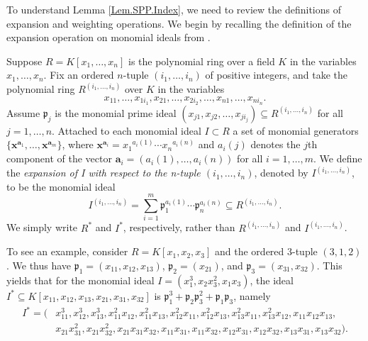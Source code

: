 \documentclass[11pt]{amsart}
\begin{document}
 To understand  Lemma \ref{Lem.SPP.Index}, we need to review the definitions of expansion and weighting operations. 
 We begin by recalling   the definition of the expansion operation  on monomial ideals from  \cite{BH}. \par 
Suppose  $R = K[x_1, \ldots , x_n]$ is  the polynomial ring over a field $K$ in the variables $x_1, \ldots , x_n$. Fix an ordered $n$-tuple $(i_1, \ldots , i_n)$ of positive integers, and take the polynomial ring $R^{(i_1,\ldots ,i_n)}$ over $K$ in the variables $$x_{11}, \ldots , x_{1i_1} , x_{21}, \ldots , x_{2i_2} , \ldots , x_{n1}, \ldots , x_{ni_n}.$$
Assume  $\mathfrak{p}_j$ is  the monomial prime ideal $(x_{j1}, x_{j2}, \ldots , x_{ji_j}) \subseteq R^{(i_1,\ldots,i_n)}$ for all $j=1,\ldots,n$. Attached to each monomial ideal $I \subset R$ a set of monomial generators $\{\mathbf {x}^{\mathbf{ a}_1} , \ldots , {\mathbf x}^{{\mathbf a}_m}\}$, where ${\mathbf x}^{\mathbf a_i}={x_1}^{a_i(1)}\cdots {x_n}^{a_i(n)}$ and $a_i(j)$ denotes the $j$th component of the vector ${\mathbf a}_i=(a_i(1),\ldots,a_i(n))$ for all $i=1,\ldots,m$. We define the {\it expansion of I with respect to the n-tuple $(i_1, \ldots, i_n)$}, denoted by $I^{(i_1,\ldots,i_n)}$, to be the monomial ideal
$$I^{(i_1,\ldots,i_n)} = \sum_{i=1}^m \mathfrak{p}_1^{a_i(1)}\cdots \mathfrak{p}_n^{a_i(n)}\subseteq R^{(i_1,\ldots,i_n)}.$$
We simply write $R^*$ and $I^*$,
respectively, rather than $R^{(i_1,\ldots,i_n)}$ and $I^{(i_1,\ldots,i_n)}$.\par
To see  an  example, consider    $R = K[x_1, x_2, x_3]$ and the ordered $3$-tuple $(3,1,2)$. We thus have 
 $\mathfrak{p}_1 = (x_{11},x_{12}, x_{13})$, $\mathfrak{p}_2 = (x_{21})$, and $\mathfrak{p}_3 = (x_{31}, x_{32})$. This yields  that 
for the monomial ideal $I = (x_1^3, x_2x_3^2,  x_1 x_3)$, the ideal $I^* \subseteq K[x_{11}, x_{12}, x_{13}, x_{21}, x_{31}, x_{32}]$ is $\mathfrak{p}_1^3+\mathfrak{p}_2\mathfrak{p}^2_3+\mathfrak{p}_1\mathfrak{p}_3$, namely
\begin{align*}
I^*=(&x_{11}^3, x_{12}^3, x_{13}^3, x_{11}^2x_{12}, x_{11}^2x_{13}, x_{12}^2 x_{11}, x_{12}^2 x_{13}, x_{13}^2 x_{11}, 
x_{13}^2 x_{12}, x_{11} x_{12} x_{13}, \\
& x_{21} x_{31}^2, x_{21} x_{32}^2, x_{21} x_{31}x_{32}, x_{11} x_{31},  x_{11}x_{32}, x_{12}x_{31}, x_{12} x_{32}, x_{13}x_{31}, x_{13}x_{32}). 
\end{align*}


\end{document}

